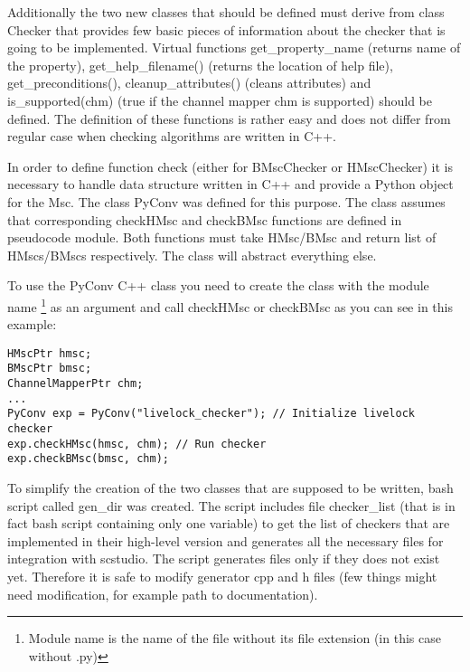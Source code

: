 \documentclass[11pt,oneside]{fithesis2}
\begin{document}
Additionally the two new classes that should be defined must derive from class Checker that provides few basic pieces of information about the checker that is going to be implemented. Virtual functions get\_property\_name (returns name of the property), get\_help\_filename() (returns the location of help file), get\_preconditions(), cleanup\_attributes() (cleans attributes) and is\_supported(chm) (true if the channel mapper chm is supported) should be defined. The definition of these functions is rather easy and does not differ from regular case when checking algorithms are written in C++.

In order to define function check (either for BMscChecker or HMscChecker) it is necessary to handle data structure written in C++ and provide a Python object for the Msc. The class PyConv was defined for this purpose. The class assumes that corresponding checkHMsc and checkBMsc functions are defined in pseudocode module. Both functions must take HMsc/BMsc and return list of HMscs/BMscs respectively. The class will abstract everything else.

To use the PyConv C++ class you need to create the class with the module name \footnote{Module name is the name of the file without its file extension (in this case without .py)} as an argument and call checkHMsc or checkBMsc as you can see in this example:
\begin{lstlisting}
HMscPtr hmsc;
BMscPtr bmsc;
ChannelMapperPtr chm;
...
PyConv exp = PyConv("livelock_checker"); // Initialize livelock checker
exp.checkHMsc(hmsc, chm); // Run checker
exp.checkBMsc(bmsc, chm);
\end{lstlisting}

To simplify the creation of the two classes that are supposed to be written, bash script called gen\_dir was created. The script includes file checker\_list (that is in fact bash script containing only one variable) to get the list of checkers that are implemented in their high-level version and generates all the necessary files for integration with scstudio. The script generates files only if they does not exist yet. Therefore it is safe to modify generator cpp and h files (few things might need modification, for example path to documentation).
\end{document}
